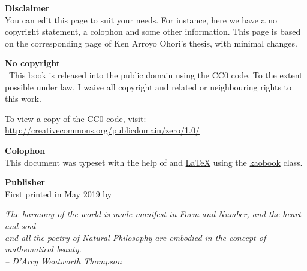 \documentclass[
  a4paper,
	fontsize=10pt, %
	twoside=false, %
	secnumdepth=1, %
  numbers=noenddot,
  fontmethod=tex,
]{kaobook}
\begin{document}
\begin{titlepage}%
  \raggedright%
  \@titlehead%
  \vfill%
  \textbf{Disclaimer} \\
  You can edit this page to suit your needs. For instance, here we have a no copyright statement, a colophon and some other information. This page is based on the corresponding page of Ken Arroyo Ohori's thesis, with minimal changes.

  \medskip

  \textbf{No copyright} \\
  \cczero\ This book is released into the public domain using the CC0 code. To the extent possible under law, I waive all copyright and related or neighbouring rights to this work.

  To view a copy of the CC0 code, visit: \\\url{http://creativecommons.org/publicdomain/zero/1.0/}

  \medskip

  \textbf{Colophon} \\
  This document was typeset with the help of \href{https://sourceforge.net/projects/koma-script/}{\KOMAScript} and \href{https://www.latex-project.org/}{\LaTeX} using the \href{https://github.com/fmarotta/kaobook/}{kaobook} class.

  \medskip

  \textbf{Publisher} \\
  First printed in May 2019 by \@publishers%
\end{titlepage}%

\thispagestyle{empty}%
\null\vfill%
\begin{flushright}%
  \itshape%
  The harmony of the world is made manifest in Form and Number, and the heart and soul\\
  and all the poetry of Natural Philosophy are embodied in the concept of mathematical beauty.\\
  \medskip
  -- D'Arcy Wentworth Thompson%
\end{flushright}%
\vfill\null%
\clearpage%

\makeatother




\end{document}
